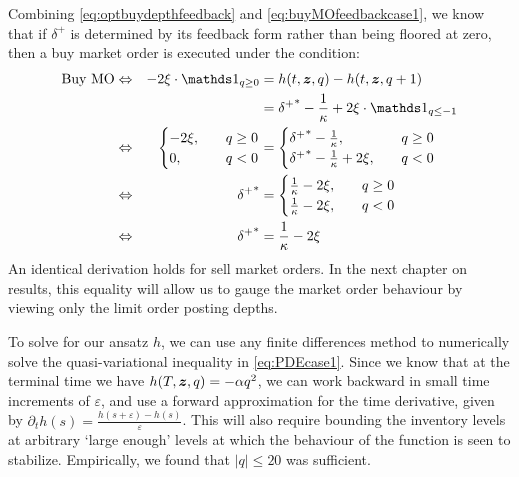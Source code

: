 Combining \eqref{eq:optbuydepthfeedback} and \eqref{eq:buyMOfeedbackcase1}, we know that if $\delta^+$ is determined by its feedback form rather than being floored at zero, then a buy market order is executed under the condition:
\begin{align}
\text{Buy MO} & \iff & -2 \xi \cdot \indicator_{q \geq 0} & = h(t,\bz,q) - h(t, \bz, q+1)  \\
& & & = {\delta^+}^* - \frac{1}{\kappa} + 2 \xi \cdot \indicator_{q \leq -1} \\
& \iff &  \begin{cases} -2 \xi, \quad & q \geq 0 \\ 0, \quad & q < 0 \end{cases} & = 
\begin{cases} {\delta^+}^* - \frac{1}{\kappa}, \quad & q \geq 0 \\
{\delta^+}^* - \frac{1}{\kappa} + 2 \xi, \quad & q < 0 \end{cases} \\
& \iff &  {\delta^+}^* & = \begin{cases} \frac{1}{\kappa} -2 \xi, \quad & q \geq 0 \\
\frac{1}{\kappa} - 2 \xi, \quad & q < 0 \end{cases} \\
& \iff & {\delta^+}^* & =  \frac{1}{\kappa} - 2 \xi \label{eq:ctsBuycondition}
\end{align}
An identical derivation holds for sell market orders. In the next chapter on results, this equality will allow us to gauge the market order behaviour by viewing only the limit order posting depths.

To solve for our ansatz $h$, we can use any finite differences method \citep{CS522} to numerically solve the quasi-variational inequality in \eqref{eq:PDEcase1}. Since we know that at the terminal time we have $h(T,\bm{z},q) = -\alpha q^2$, we can work backward in small time increments of $\varepsilon$, and use a forward approximation for the time derivative, given by $\partial_t h (s) = \frac{h(s+\varepsilon) - h(s)}{\varepsilon}$. This will also require bounding the inventory levels at arbitrary `large enough' levels at which the behaviour of the function is seen to stabilize. Empirically, we found that $|q|\leq 20$ was sufficient. 